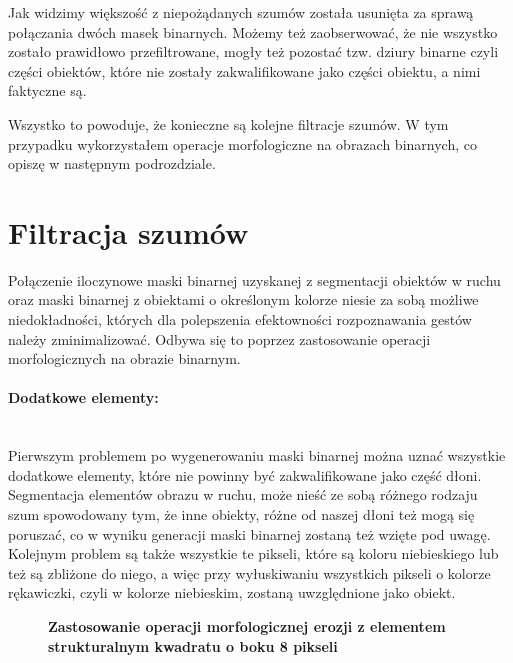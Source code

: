 \documentclass[a4paper,12pt,twoside,openany]{report}
\newcommand{\ImgPath}{.}
\begin{document}
Jak widzimy większość z niepożądanych szumów została usunięta za sprawą połączania dwóch masek binarnych. Możemy też zaobserwować, że nie wszystko zostało prawidłowo przefiltrowane, mogły też pozostać tzw. dziury binarne czyli części obiektów, które nie zostały zakwalifikowane jako części obiektu, a nimi faktyczne są. 

Wszystko to powoduje, że konieczne są kolejne filtracje szumów. W tym przypadku wykorzystałem operacje morfologiczne na obrazach binarnych, co opiszę w następnym podrozdziale.  

\section{Filtracja szumów}
Połączenie iloczynowe maski binarnej uzyskanej z segmentacji obiektów w ruchu oraz maski binarnej z obiektami o określonym kolorze niesie za sobą możliwe niedokładności, których dla polepszenia efektowności rozpoznawania gestów należy zminimalizować. Odbywa się to poprzez zastosowanie operacji morfologicznych na obrazie binarnym. 

\paragraph{Dodatkowe elementy:} \mbox{} \\
Pierwszym problemem po wygenerowaniu maski binarnej można uznać wszystkie dodatkowe elementy, które nie powinny być zakwalifikowane jako część dłoni. Segmentacja elementów obrazu w ruchu, może nieść ze sobą różnego rodzaju szum spowodowany tym, że inne obiekty, różne od naszej dłoni też mogą się poruszać, co w wyniku generacji maski binarnej zostaną też wzięte pod uwagę. Kolejnym problem są także wszystkie te pikseli, które są koloru niebieskiego lub też są zbliżone do niego, a więc przy wyłuskiwaniu wszystkich pikseli o kolorze rękawiczki, czyli w kolorze niebieskim, zostaną uwzględnione jako obiekt.

\begin{figure}[H]
	\centering
	\caption{  \textbf{Zastosowanie operacji morfologicznej erozji z elementem strukturalnym kwadratu o boku 8 pikseli}}
\end{figure}
\end{document}
